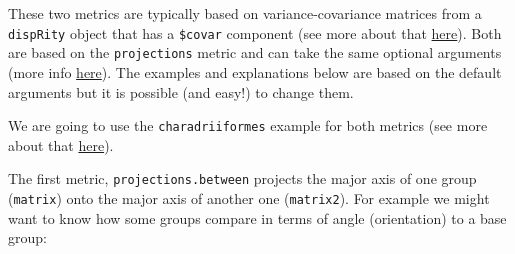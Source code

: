\documentclass[
]{book}
\newenvironment{Shaded}{\begin{snugshade}}{\end{snugshade}}
\newcommand{\AttributeTok}[1]{\textcolor[rgb]{0.13,0.29,0.53}{#1}}
\newcommand{\DecValTok}[1]{\textcolor[rgb]{0.00,0.00,0.81}{#1}}
\newcommand{\DocumentationTok}[1]{\textcolor[rgb]{0.56,0.35,0.01}{\textbf{\textit{#1}}}}
\newcommand{\FunctionTok}[1]{\textcolor[rgb]{0.13,0.29,0.53}{\textbf{#1}}}
\newcommand{\NormalTok}[1]{#1}
\newcommand{\OtherTok}[1]{\textcolor[rgb]{0.56,0.35,0.01}{#1}}
\newcommand{\SpecialCharTok}[1]{\textcolor[rgb]{0.81,0.36,0.00}{\textbf{#1}}}
\newcommand{\StringTok}[1]{\textcolor[rgb]{0.31,0.60,0.02}{#1}}
\begin{document}
These two metrics are typically based on variance-covariance matrices from a \texttt{dispRity} object that has a \texttt{\$covar} component (see more about that \protect\hyperlink{covar}{here}).
Both are based on the \texttt{projections} metric and can take the same optional arguments (more info \protect\hyperlink{projections}{here}).
The examples and explanations below are based on the default arguments but it is possible (and easy!) to change them.

We are going to use the \texttt{charadriiformes} example for both metrics (see more about that \protect\hyperlink{covar}{here}).

\begin{Shaded}
\end{Shaded}

The first metric, \texttt{projections.between} projects the major axis of one group (\texttt{matrix}) onto the major axis of another one (\texttt{matrix2}).
For example we might want to know how some groups compare in terms of angle (orientation) to a base group:
\end{document}
